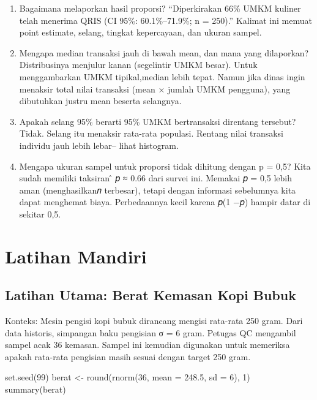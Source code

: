 \documentclass[
  indonesian,
  letterpaper,
]{book}
\newenvironment{Shaded}{\begin{snugshade}}{\end{snugshade}}
\newcommand{\AttributeTok}[1]{\textcolor[rgb]{0.40,0.45,0.13}{#1}}
\newcommand{\DecValTok}[1]{\textcolor[rgb]{0.68,0.00,0.00}{#1}}
\newcommand{\FloatTok}[1]{\textcolor[rgb]{0.68,0.00,0.00}{#1}}
\newcommand{\FunctionTok}[1]{\textcolor[rgb]{0.28,0.35,0.67}{#1}}
\newcommand{\NormalTok}[1]{\textcolor[rgb]{0.00,0.23,0.31}{#1}}
\newcommand{\OtherTok}[1]{\textcolor[rgb]{0.00,0.23,0.31}{#1}}
\begin{document}
\begin{enumerate}
\def\labelenumi{\arabic{enumi}.}
\item
  Bagaimana melaporkan hasil proporsi? ``Diperkirakan 66\% UMKM kuliner
  telah menerima QRIS (CI 95\%: 60.1\%--71.9\%; n = 250).'' Kalimat ini
  memuat point estimate, selang, tingkat kepercayaan, dan ukuran sampel.
\item
  Mengapa median transaksi jauh di bawah mean, dan mana yang dilaporkan?
  Distribusinya menjulur kanan (segelintir UMKM besar). Untuk
  menggambarkan UMKM tipikal,median lebih tepat. Namun jika dinas ingin
  menaksir total nilai transaksi (mean × jumlah UMKM pengguna), yang
  dibutuhkan justru mean beserta selangnya.
\item
  Apakah selang 95\% berarti 95\% UMKM bertransaksi direntang tersebut?
  Tidak. Selang itu menaksir rata-rata populasi. Rentang nilai transaksi
  individu jauh lebih lebar-- lihat histogram.
\item
  Mengapa ukuran sampel untuk proporsi tidak dihitung dengan p = 0,5?
  Kita sudah memiliki taksiran ̂ 𝑝 ≈ 0.66 dari survei ini. Memakai 𝑝 =
  0,5 lebih aman (menghasilkan𝑛 terbesar), tetapi dengan informasi
  sebelumnya kita dapat menghemat biaya. Perbedaannya kecil karena 𝑝(1
  −𝑝) hampir datar di sekitar 0,5.
\end{enumerate}

\section{Latihan Mandiri}\label{latihan-mandiri}

\subsection{Latihan Utama: Berat Kemasan Kopi
Bubuk}\label{latihan-utama-berat-kemasan-kopi-bubuk}

Konteks: Mesin pengisi kopi bubuk dirancang mengisi rata-rata 250 gram.
Dari data historis, simpangan baku pengisian σ = 6 gram. Petugas QC
mengambil sampel acak 36 kemasan. Sampel ini kemudian digunakan untuk
memeriksa apakah rata-rata pengisian masih sesuai dengan target 250
gram.

\begin{Shaded}
\begin{Highlighting}[]
\FunctionTok{set.seed}\NormalTok{(}\DecValTok{99}\NormalTok{)}
\NormalTok{berat }\OtherTok{\textless{}{-}} \FunctionTok{round}\NormalTok{(}\FunctionTok{rnorm}\NormalTok{(}\DecValTok{36}\NormalTok{, }\AttributeTok{mean =} \FloatTok{248.5}\NormalTok{, }\AttributeTok{sd =} \DecValTok{6}\NormalTok{), }\DecValTok{1}\NormalTok{)}
\FunctionTok{summary}\NormalTok{(berat)}
\end{Highlighting}
\end{Shaded}
\end{document}
